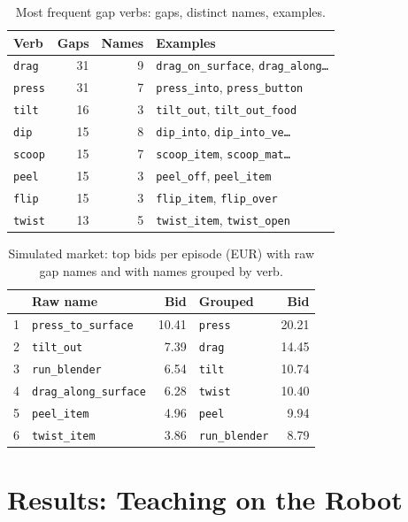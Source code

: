 \documentclass[10pt,twocolumn,letterpaper]{article}
\newcommand{\code}[1]{\texttt{\small #1}}
\begin{document}
\begin{table}[t]
\centering\small
\caption{Most frequent gap verbs: gaps, distinct names, examples.}
\label{tab:verbs}
\setlength{\tabcolsep}{3pt}\footnotesize
\begin{tabular}{@{}lrrl@{}}
\toprule
Verb & Gaps & Names & Examples\\
\midrule
\code{drag} & 31 & 9 & \code{drag\_on\_surface}, \code{drag\_along\ldots}\\
\code{press} & 31 & 7 & \code{press\_into}, \code{press\_button}\\
\code{tilt} & 16 & 3 & \code{tilt\_out}, \code{tilt\_out\_food}\\
\code{dip} & 15 & 8 & \code{dip\_into}, \code{dip\_into\_ve\ldots}\\
\code{scoop} & 15 & 7 & \code{scoop\_item}, \code{scoop\_mat\ldots}\\
\code{peel} & 15 & 3 & \code{peel\_off}, \code{peel\_item}\\
\code{flip} & 15 & 3 & \code{flip\_item}, \code{flip\_over}\\
\code{twist} & 13 & 5 & \code{twist\_item}, \code{twist\_open}\\
\bottomrule
\end{tabular}
\end{table}

\begin{table}[t]
\centering\small
\caption{Simulated market: top bids per episode (EUR) with raw gap names and with names grouped by verb.}
\label{tab:bids}
\begin{tabular}{@{}llrlr@{}}
\toprule
& Raw name & Bid & Grouped & Bid\\
\midrule
1 & \code{press\_to\_surface} & 10.41 & \code{press} & 20.21\\
2 & \code{tilt\_out} & 7.39 & \code{drag} & 14.45\\
3 & \code{run\_blender} & 6.54 & \code{tilt} & 10.74\\
4 & \code{drag\_along\_surface} & 6.28 & \code{twist} & 10.40\\
5 & \code{peel\_item} & 4.96 & \code{peel} & 9.94\\
6 & \code{twist\_item} & 3.86 & \code{run\_blender} & 8.79\\
\bottomrule
\end{tabular}
\end{table}

\section{Results: Teaching on the Robot}\label{sec:res-robot}
\end{document}
